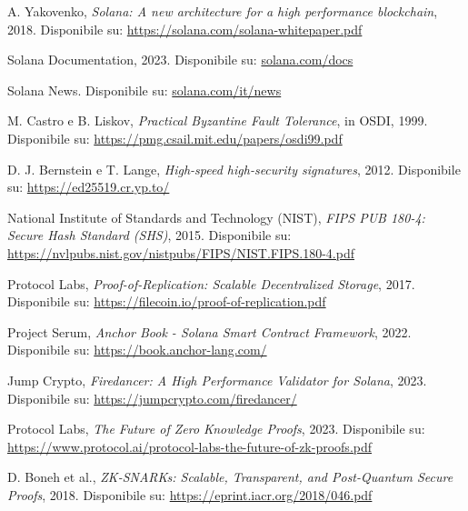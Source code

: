 \documentclass[a4paper,12pt]{report}
\begin{document}
	\begin{thebibliography}{99}
		A. Yakovenko, \emph{Solana: A new architecture for a high performance blockchain}, 2018. Disponibile su: \url{https://solana.com/solana-whitepaper.pdf}
		
		Solana Documentation, 2023. Disponibile su:
		\url{solana.com/docs}
		
		Solana News. Disponibile su:
		\url{solana.com/it/news}
		
		M. Castro e B. Liskov, \emph{Practical Byzantine Fault Tolerance}, in OSDI, 1999. Disponibile su: \url{https://pmg.csail.mit.edu/papers/osdi99.pdf}
		
		D. J. Bernstein e T. Lange, \emph{High-speed high-security signatures}, 2012. Disponibile su: \url{https://ed25519.cr.yp.to/}
		
		National Institute of Standards and Technology (NIST), \emph{FIPS PUB 180-4: Secure Hash Standard (SHS)}, 2015. Disponibile su: \url{https://nvlpubs.nist.gov/nistpubs/FIPS/NIST.FIPS.180-4.pdf}
		
		Protocol Labs, \emph{Proof-of-Replication: Scalable Decentralized Storage}, 2017. Disponibile su: \url{https://filecoin.io/proof-of-replication.pdf}
		
		Project Serum, \emph{Anchor Book - Solana Smart Contract Framework}, 2022. Disponibile su: \url{https://book.anchor-lang.com/}
		
		Jump Crypto, \emph{Firedancer: A High Performance Validator for Solana}, 2023. Disponibile su: \url{https://jumpcrypto.com/firedancer/}
		
		Protocol Labs, \emph{The Future of Zero Knowledge Proofs}, 2023. Disponibile su: \url{https://www.protocol.ai/protocol-labs-the-future-of-zk-proofs.pdf}
		
		D. Boneh et al., \emph{ZK-SNARKs: Scalable, Transparent, and Post-Quantum Secure Proofs}, 2018. Disponibile su: \url{https://eprint.iacr.org/2018/046.pdf}
		
	\end{thebibliography}
	
\end{document}
